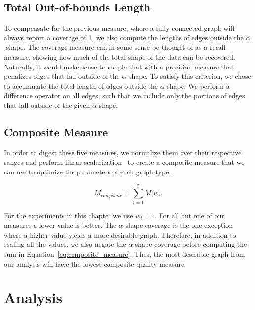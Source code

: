 \subsection{Total Out-of-bounds Length}
%
To compensate for the previous measure, where a fully connected graph will always report a coverage of 1, we also compute the lengths of edges outside the $\alpha$-shape.
%
%
The coverage measure can in some sense be thought of as a recall measure, showing how much of the total shape of the data can be recovered.
%
Naturally, it would make sense to couple that with a precision measure that penalizes edges that fall outside of the $\alpha$-shape.
%
To satisfy this criterion, we chose to accumulate the total length of edges outside the $\alpha$-shape.
%
We perform a difference operator on all edges, such that we include only the portions of edges that fall outside of the given $\alpha$-shape.

\subsection{Composite Measure}
In order to digest these five measures, we normalize them over their respective ranges and perform linear scalarization~\cite{HwangMasud1979} to create a composite measure that we can use to optimize the parameters of each graph type,

\begin{equation}
    M_{composite} = \sum_{i=1}^5 M_iw_i.
\label{eq:composite_measure}
\end{equation}

For the experiments in this chapter we use $w_i=1$.
%
For all but one of our measures a lower value is better.
%
The $\alpha$-shape coverage is the one exception where a higher value yields a more desirable graph.
%
Therefore, in addition to scaling all the values, we also negate the $\alpha$-shape coverage before computing the sum in Equation~\ref{eq:composite_measure}.
%
Thus, the most desirable graph from our analysis will have the lowest composite quality measure.

\section{Analysis}

